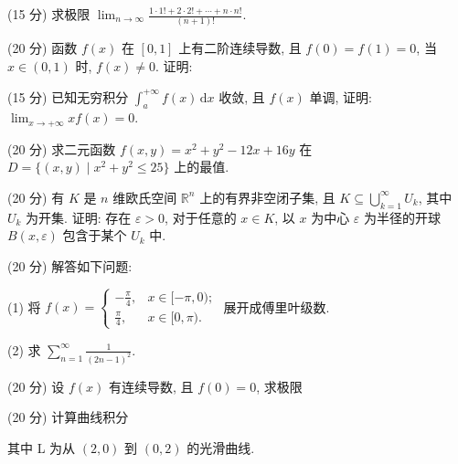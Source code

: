 (15 分) 求极限 $\lim_{n\to \infty}\frac{1\cdot 1! + 2\cdot 2! + \cdots + n\cdot n!}{(n + 1)!}$.\par
\par{}
(20 分) 函数 $f(x)$ 在 $[0,1]$ 上有二阶连续导数, 且 $f(0) = f(1) = 0$, 当 $x \in (0,1)$ 时, $f(x) \neq 0$. 证明:\par
\nopagebreak[4]
(15 分) 已知无穷积分 $\int_{a}^{+\infty} f(x) \, \mathrm{d}x$ 收敛, 且 $f(x)$ 单调, 证明: $\lim_{x \to +\infty} x f(x) = 0$.\par
(20 分) 求二元函数 $f(x, y) = x^2 + y^2 - 12x + 16y$ 在 $D = \{(x, y) \mid x^2 + y^2 \leq 25\}$ 上的最值.\par
(20 分) 有 $K$ 是 $n$ 维欧氏空间 $\mathbb{R}^n$ 上的有界非空闭子集, 且 $K \subseteq \bigcup_{k=1}^{\infty} U_k$, 其中 $U_k$ 为开集. 证明: 存在 $\varepsilon > 0$, 对于任意的 $x \in K$, 以 $x$ 为中心 $\varepsilon$ 为半径的开球 $B(x, \varepsilon)$ 包含于某个 $U_k$ 中.\par
(20 分) 解答如下问题:\par
(1) 将 $f(x) = \begin{cases} -\frac{\pi}{4}, & x \in [-\pi, 0); \\ \frac{\pi}{4}, & x \in [0, \pi). \end{cases}$ 展开成傅里叶级数.\par
(2) 求 $\sum_{n=1}^{\infty} \frac{1}{(2n-1)^2}$.\par
\par{}
(20 分) 设 $f(x)$ 有连续导数, 且 $f(0) = 0$, 求极限\par
\nopagebreak[4]
\par{}
(20 分) 计算曲线积分\par
\nopagebreak[4]
其中 L 为从  $(2,0)$  到  $(0,2)$  的光滑曲线.\par
